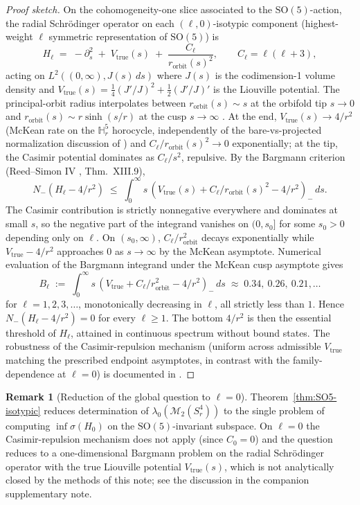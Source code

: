\documentclass[11pt,letterpaper]{article}
\theoremstyle{definition}
\newtheorem{remark}[theorem]{Remark}
\newcommand{\bbH}{\mathbb{H}}
\newcommand{\cM}{\mathcal{M}}
\begin{document}
\begin{proof}[Proof sketch]
On the cohomogeneity-one slice associated to the $\mathrm{SO}(5)$-action, the radial Schr\"odinger operator on each $(\ell, 0)$-isotypic component (highest-weight $\ell$ symmetric representation of $\mathrm{SO}(5)$) is
\[
H_\ell \;=\; -\partial_s^2 \;+\; V_{\mathrm{true}}(s) \;+\; \frac{C_\ell}{r_{\mathrm{orbit}}(s)^2},\qquad C_\ell = \ell(\ell+3),
\]
acting on $L^2((0,\infty), J(s)\,ds)$ where $J(s)$ is the codimension-1 volume density and $V_{\mathrm{true}}(s) = \tfrac14(J'/J)^2 + \tfrac12(J'/J)'$ is the Liouville potential. The principal-orbit radius interpolates between $r_{\mathrm{orbit}}(s) \sim s$ at the orbifold tip $s\to 0$ and $r_{\mathrm{orbit}}(s) \sim r\sinh(s/r)$ at the cusp $s\to\infty$ \cite{m2-isotypic-decomposition}. At the end, $V_{\mathrm{true}}(s) \to 4/r^2$ (McKean rate on the $\bbH^5_r$ horocycle, independently of the bare-vs-projected normalization discussion of \cite{m2-closure-higher-order}) and $C_\ell/r_{\mathrm{orbit}}(s)^2 \to 0$ exponentially; at the tip, the Casimir potential dominates as $C_\ell/s^2$, repulsive. By the Bargmann criterion (Reed--Simon IV \cite{ReedSimonIV}, Thm.~XIII.9),
\[
N_-(H_\ell - 4/r^2) \;\le\; \int_0^\infty s\,(V_{\mathrm{true}}(s) + C_\ell/r_{\mathrm{orbit}}(s)^2 - 4/r^2)_-\,ds.
\]
The Casimir contribution is strictly nonnegative everywhere and dominates at small $s$, so the negative part of the integrand vanishes on $(0, s_0]$ for some $s_0 > 0$ depending only on $\ell$. On $(s_0,\infty)$, $C_\ell/r_{\mathrm{orbit}}^2$ decays exponentially while $V_{\mathrm{true}}-4/r^2$ approaches $0$ as $s\to\infty$ by the McKean asymptote. Numerical evaluation \cite{m2-isotypic-decomposition} of the Bargmann integrand under the McKean cusp asymptote gives
\[
B_\ell \;:=\; \int_0^\infty s\,(V_{\mathrm{true}}+ C_\ell/r_{\mathrm{orbit}}^2 - 4/r^2)_-\,ds \;\approx\; 0.34,\ 0.26,\ 0.21,\ldots
\]
for $\ell = 1,2,3,\ldots$, monotonically decreasing in $\ell$, all strictly less than $1$. Hence $N_-(H_\ell - 4/r^2) = 0$ for every $\ell \ge 1$. The bottom $4/r^2$ is then the essential threshold of $H_\ell$, attained in continuous spectrum without bound states. The robustness of the Casimir-repulsion mechanism (uniform across admissible $V_{\mathrm{true}}$ matching the prescribed endpoint asymptotes, in contrast with the family-dependence at $\ell = 0$) is documented in \cite{m2-isotypic-decomposition}.
\end{proof}

\begin{remark}[Reduction of the global question to $\ell = 0$]\label{rmk:isotypic-reduction}
Theorem~\ref{thm:SO5-isotypic} reduces determination of $\lambda_0(\cM_2(S^4_r))$ to the single problem of computing $\inf\sigma(H_0)$ on the $\mathrm{SO}(5)$-invariant subspace. On $\ell = 0$ the Casimir-repulsion mechanism does not apply (since $C_0 = 0$) and the question reduces to a one-dimensional Bargmann problem on the radial Schr\"odinger operator with the true Liouville potential $V_{\mathrm{true}}(s)$, which is not analytically closed by the methods of this note; see the discussion in the companion supplementary note.
\end{remark}
\end{document}

